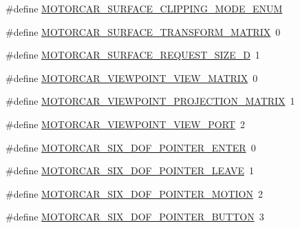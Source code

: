 \begin{DoxyCompactItemize}
\item 
\#define \hyperlink{motorcar-server-protocol_8h_a05c9db4a248e2261dd9c82c9cc7ba0c8}{M\-O\-T\-O\-R\-C\-A\-R\-\_\-\-S\-U\-R\-F\-A\-C\-E\-\_\-\-C\-L\-I\-P\-P\-I\-N\-G\-\_\-\-M\-O\-D\-E\-\_\-\-E\-N\-U\-M}
\item 
\#define \hyperlink{motorcar-server-protocol_8h_a0573d4db67f105f7abb6b6c9b3b2af70}{M\-O\-T\-O\-R\-C\-A\-R\-\_\-\-S\-U\-R\-F\-A\-C\-E\-\_\-\-T\-R\-A\-N\-S\-F\-O\-R\-M\-\_\-\-M\-A\-T\-R\-I\-X}~0
\item 
\#define \hyperlink{motorcar-server-protocol_8h_a0ff1af3b84582b15d3878b767f6d7fd6}{M\-O\-T\-O\-R\-C\-A\-R\-\_\-\-S\-U\-R\-F\-A\-C\-E\-\_\-\-R\-E\-Q\-U\-E\-S\-T\-\_\-\-S\-I\-Z\-E\-\_\-D}~1
\item 
\#define \hyperlink{motorcar-server-protocol_8h_a3cec8e451ef597650403195a97bfd54c}{M\-O\-T\-O\-R\-C\-A\-R\-\_\-\-V\-I\-E\-W\-P\-O\-I\-N\-T\-\_\-\-V\-I\-E\-W\-\_\-\-M\-A\-T\-R\-I\-X}~0
\item 
\#define \hyperlink{motorcar-server-protocol_8h_a90193588ef42c30b79a2547016ecfbef}{M\-O\-T\-O\-R\-C\-A\-R\-\_\-\-V\-I\-E\-W\-P\-O\-I\-N\-T\-\_\-\-P\-R\-O\-J\-E\-C\-T\-I\-O\-N\-\_\-\-M\-A\-T\-R\-I\-X}~1
\item 
\#define \hyperlink{motorcar-server-protocol_8h_a679a63a4096a3edc578272e2308ea515}{M\-O\-T\-O\-R\-C\-A\-R\-\_\-\-V\-I\-E\-W\-P\-O\-I\-N\-T\-\_\-\-V\-I\-E\-W\-\_\-\-P\-O\-R\-T}~2
\item 
\#define \hyperlink{motorcar-server-protocol_8h_ae42889611b1145e0c4c3d1528e4915b1}{M\-O\-T\-O\-R\-C\-A\-R\-\_\-\-S\-I\-X\-\_\-\-D\-O\-F\-\_\-\-P\-O\-I\-N\-T\-E\-R\-\_\-\-E\-N\-T\-E\-R}~0
\item 
\#define \hyperlink{motorcar-server-protocol_8h_ac2f4873d9bf74e18b743ab57c9267568}{M\-O\-T\-O\-R\-C\-A\-R\-\_\-\-S\-I\-X\-\_\-\-D\-O\-F\-\_\-\-P\-O\-I\-N\-T\-E\-R\-\_\-\-L\-E\-A\-V\-E}~1
\item 
\#define \hyperlink{motorcar-server-protocol_8h_a899c865cbaf16519069ae1318a2a951f}{M\-O\-T\-O\-R\-C\-A\-R\-\_\-\-S\-I\-X\-\_\-\-D\-O\-F\-\_\-\-P\-O\-I\-N\-T\-E\-R\-\_\-\-M\-O\-T\-I\-O\-N}~2
\item 
\#define \hyperlink{motorcar-server-protocol_8h_ab09e16252e6ddccd750aae1bb9ee0900}{M\-O\-T\-O\-R\-C\-A\-R\-\_\-\-S\-I\-X\-\_\-\-D\-O\-F\-\_\-\-P\-O\-I\-N\-T\-E\-R\-\_\-\-B\-U\-T\-T\-O\-N}~3
\end{DoxyCompactItemize}
